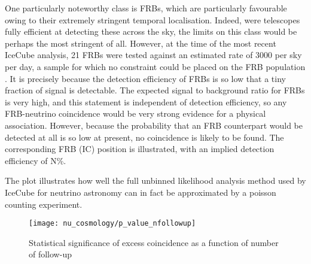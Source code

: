 One particularly noteworthy class is FRBs, which are particularly favourable owing to their extremely stringent temporal localisation. Indeed, were telescopes fully efficient at detecting these across the sky, the limits on this class would be perhaps the most stringent of all. However, at the time of the most recent IceCube analysis, 21 FRBs were tested against an estimated rate of 3000 per sky per day, a sample for which no constraint could be placed on the FRB population . It is precisely because the detection efficiency of FRBs is so low that a tiny fraction of signal is detectable. The expected signal to background ratio for FRBs is very high, and this statement is independent of detection efficiency, so any FRB-neutrino coincidence would be very strong evidence for a physical association. However, because the probability that an FRB counterpart would be detected at all is so low at present, no coincidence is likely to be found. The corresponding FRB (IC) position is illustrated, with an implied detection efficiency of N\%. 

The plot illustrates how well the full unbinned likelihood analysis method used by IceCube for neutrino astronomy can in fact be approximated by a poisson counting experiment.

\begin{figure}[!ht]
	\centering \texttt{[image: nu\_cosmology/p\_value\_nfollowup]}
	\caption{Statistical significance of excess coincidence as a function of number of follow-up}
	\label{fig:p_value}
\end{figure}
